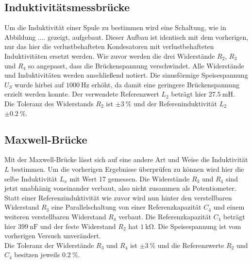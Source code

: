 \subsection{Induktivitätsmessbrücke}
Um die Induktivität einer Spule zu bestimmen wird eine Schaltung, wie in Abbildung .... gezeigt, aufgebaut. Dieser Aufbau ist identisch mit dem vorherigen, nur das hier die verlustbehafteten Kondesatoren mit verlustbehafteten Induktivitäten
ersetzt werden. Wie zuvor werden die drei Widerstände $R_{2}$, $R_{3}$ und $R_{4}$ so angepasst, dass die Brückenspannung verschwindet. Alle Widerstände und Induktivitäten werden anschließend notiert. Die sinusförmige Speisespannung $U_{S}$
wurde hirbei auf $\SI{1000}{\hertz}$ erhöht, da damit eine geringere Brückenspannung erzielt werden konnte.
Der verwendete Referenzwert $L_{2}$ beträgt hier $\SI{27.5}{\milli\henry}$. 
\\
\newline
Die Toleranz des Widerstands $R_{2}$ ist $\pm\SI{3}{\percent}$ und der Refereninduktivität $L_{2}$ $\pm\SI{0.2}{\percent}$.

\subsection{Maxwell-Brücke}
Mit der Maxwell-Brücke lässt sich auf eine andere Art und Weise die Induktivität $L$ bestimmen. Um die vorherigen Ergebnisse überprüfen zu können wird hier die selbe Induktivität $L_{x}$ mit Wert 17 gemessen. Die Widerstände $R_{3}$ und $R_{4}$ sind
jetzt unabhänig voneinander verbaut, also nicht zusammen als Potentiometer. Statt einer Referenzinduktivität wie zuvor wird nun hinter den verstellbaren Widerstand $R_{3}$ eine Parallelschaltung von einer Referenzkapazität $C_{4}$ und einem 
weiteren verstellbaren Widerstand $R_{4}$ verbaut. Die Referenzkapazität $C_{4}$ beträgt hier $\SI{399}{\nano\farad}$ und der feste Widerstand $R_{2}$ hat $\SI{1}{\kilo\ohm}$. Die Speisespannung ist vom vorherigen Versuch unverändert.
\\
\newline
Die Toleranz der Widerstände $R_{3}$ und $R_{4}$ ist $\pm\SI{3}{\percent}$ und die Referenzwerte $R_{2}$ und $C_{4}$ besitzen jeweils $\SI{0.2}{\percent}$.